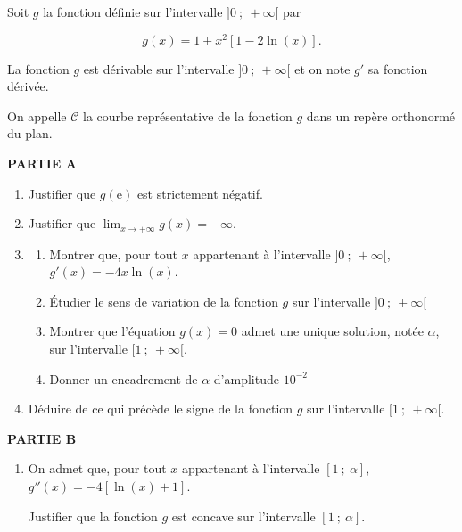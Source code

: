 \medskip

Soit $g$ la fonction définie sur l'intervalle $]0~;~+\infty[$ par 

\[g(x) = 1+ x^2[1 - 2 \ln (x)].\]

La fonction $g$ est dérivable sur l'intervalle $]0~;~+\infty[$ et on note $g'$ sa fonction dérivée.

On appelle $\mathcal{C}$ la courbe représentative de la fonction $g$ dans un repère orthonormé du plan.

\medskip

\textbf{PARTIE A}

\medskip

\begin{enumerate}
\item Justifier que $g(\text{e})$ est strictement négatif.
\item Justifier que $\displaystyle\lim_{x \to + \infty} g(x) = - \infty$.
\item 
	\begin{enumerate}
		\item Montrer que, pour tout $x$ appartenant à l'intervalle $]0~;~+\infty[$,\: $g'(x) = -4x \ln (x)$.
		\item Étudier le sens de variation de la fonction $g$ sur l'intervalle $]0~;~+\infty[$ 
		\item Montrer que l'équation $g(x) = 0$ admet une unique solution, notée $\alpha$, sur l'intervalle $[1~;~+\infty[$.
		\item Donner un encadrement de $\alpha$ d'amplitude $10^{-2}$
	\end{enumerate}
\item Déduire de ce qui précède le signe de la fonction $g$ sur l'intervalle $[1~;~+\infty[$.
\end{enumerate}

\medskip

\textbf{PARTIE B}

\medskip

\begin{enumerate}
\item On admet que, pour tout $x$ appartenant à l'intervalle $[1~;~\alpha]$, $g''(x) = - 4[\ln (x) + 1]$.

Justifier que la fonction $g$ est concave sur l'intervalle $[1~;~\alpha]$.
\end{enumerate}

